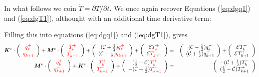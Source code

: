 In what follows we coin $\dot{T}=\partial T/\partial t$. 
We once again recover Equations (\ref{eq:dgq1}) and (\ref{eq:dgT1}), althought with 
an additional time derivative term: 



Filling this into equations (\ref{eq:dgq1}) and (\ref{eq:dgT1}), gives 
\begin{eqnarray}
{\bm K}^e \cdot 
\left( 
\begin{array}{cc}
    {\color{red}q_k^+}  \\
    {\color{red}q_{k+1}^-}
\end{array}
\right)
+
{\bm M}^e \cdot 
\left(
\begin{array}{c}
{\color{red}\dot{T}_k^+}  \\
{\color{red}\dot{T}_{k+1}^-} 
\end{array}
\right) 
+ 
\left(
\begin{array}{cc}
     ({\cal C}+\frac{1}{2})  {\color{red}q_k^+}  \\
     ({\cal C}-\frac{1}{2})  {\color{red}q_{k+1}^-} 
\end{array}
\right)+
\left(
\begin{array}{c}
     {\cal E}    {\color{red}T_k^+}  \\
     {\cal E}    {\color{red}T_{k+1}^-} 
\end{array}
\right) 
&=& 
\left(
\begin{array}{cc}
     ({\cal C}-\frac{1}{2}) q_k^-  \\
     ({\cal C}+\frac{1}{2}) q_{k+1}^+ 
\end{array}
\right)
+ \left(
\begin{array}{cc}
     {\cal E}   T_k^-  \\
     {\cal E}   T_{k+1}^+
\end{array}
\right)  
\nonumber
\\
{\bm M}^e \cdot
\left(
\begin{array}{cc}
    {\color{red}q_k^+}  \\
    {\color{red}q_{k+1}^-}
\end{array}
\right)+
{\bm K}^e \cdot
\left(
\begin{array}{cc}
 {\color{red}T_k^+}  \\
{\color{red}T_{k+1}^-} 
\end{array}
\right) 
+ \left(
\begin{array}{cc}
     (\frac{1}{2}-{\cal C}) {\color{red}T_k^+}  \\
     -({\cal C}+\frac{1}{2}){\color{red}T_{k+1}^-} 
\end{array}
\right)
&=& \left(
\begin{array}{cc}
     -({\cal C}+\frac{1}{2})  T_k^- \\
     (\frac{1}{2}-{\cal C})  T_{k+1}^+ 
\end{array}
\right) 
\end{eqnarray}


